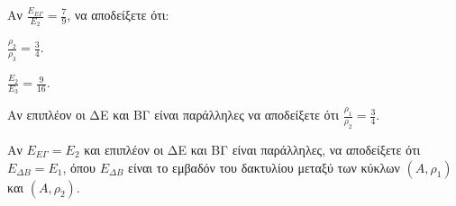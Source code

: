 \begin{alist}
\item Αν $\frac{E_{ΕΓ}}{E_2} = \frac{7}{9}$, να αποδείξετε ότι:
\begin{rlist}
    \item $\frac{\rho_2}{\rho_3} = \frac{3}{4}$. 
    \item $\frac{E_2}{E_3} = \frac{9}{16}$. 
    \item Αν επιπλέον οι ΔΕ και ΒΓ είναι παράλληλες να αποδείξετε ότι $\frac{\rho_1}{\rho_2} = \frac{3}{4}$. 
\end{rlist}
\item Αν $E_{ΕΓ} = E_2$ και επιπλέον οι ΔΕ και ΒΓ είναι παράλληλες, να αποδείξετε ότι $E_{\Delta Β} = E_1$, όπου $E_{\Delta Β}$ είναι το εμβαδόν του δακτυλίου μεταξύ των κύκλων $(A, \rho_1)$ και $(A, \rho_2)$. 
\end{alist}